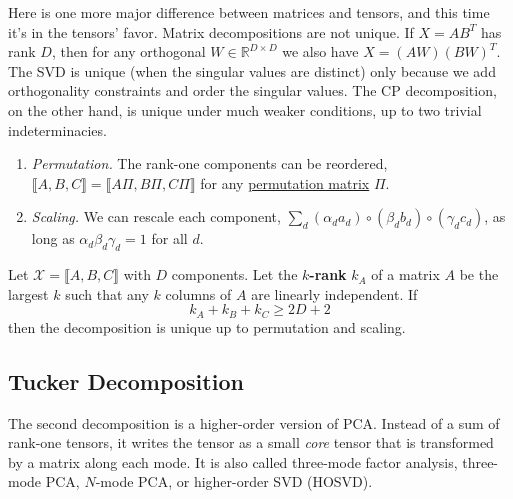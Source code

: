     Here is one more major difference between matrices and tensors, and this time it's in the tensors' favor. Matrix decompositions are not unique. If $X = A B^T$ has rank $D$, then for any orthogonal $W \in \mathbb{R}^{D \times D}$ we also have $X = (AW)(BW)^T$. The SVD is unique (when the singular values are distinct) only because we add orthogonality constraints and order the singular values. The CP decomposition, on the other hand, is unique under much weaker conditions, up to two trivial indeterminacies.
    \begin{enumerate}
      \item \textit{Permutation.} The rank-one components can be reordered, $\llbracket A, B, C \rrbracket = \llbracket A \Pi, B \Pi, C \Pi \rrbracket$ for any \hyperref[lin-def:permutation-matrix]{permutation matrix} $\Pi$.
      \item \textit{Scaling.} We can rescale each component, $\sum_d (\alpha_d a_d) \circ (\beta_d b_d) \circ (\gamma_d c_d)$, as long as $\alpha_d \beta_d \gamma_d = 1$ for all $d$.
    \end{enumerate}

    \begin{theorem}[Kruskal]
      \label{thm:kruskal}
      Let $\mathcal{X} = \llbracket A, B, C \rrbracket$ with $D$ components. Let the \textbf{$k$-rank} $k_A$ of a matrix $A$ be the largest $k$ such that any $k$ columns of $A$ are linearly independent. If
      \begin{equation}
        k_A + k_B + k_C \geq 2D + 2
      \end{equation}
      then the decomposition is unique up to permutation and scaling.
    \end{theorem}

\subsection{Tucker Decomposition}

  The second decomposition is a higher-order version of PCA. Instead of a sum of rank-one tensors, it writes the tensor as a small \textit{core} tensor that is transformed by a matrix along each mode. It is also called three-mode factor analysis, three-mode PCA, $N$-mode PCA, or higher-order SVD (HOSVD).

